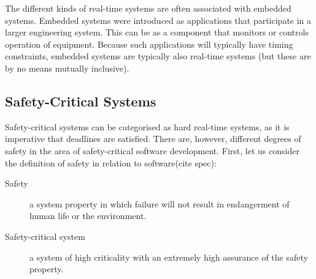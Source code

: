 The different kinds of real-time systems are often associated with embedded systems. Embedded systems were introduced as applications that participate in a larger engineering system. This can be as a component that monitors or controls operation of equipment. Because such applications will typically have timing constraints, embedded systems are typically also real-time systems (but these are by no means mutually inclusive).

\subsection{Safety-Critical Systems} %
\label{sub:safety_critical_systems}
Safety-critical systems can be categorised as hard real-time systems, as it is imperative that deadlines are satisfied. There are, however, different degrees of safety in the area of safety-critical software development. First, let us consider the definition of safety in relation to software(cite spec):
\begin{description}
	\item[Safety] a system property in which failure will not result in endangerment of human life or the environment.
	\item[Safety-critical system] a system of high criticality with an extremely high assurance of the safety property.
\end{description}

